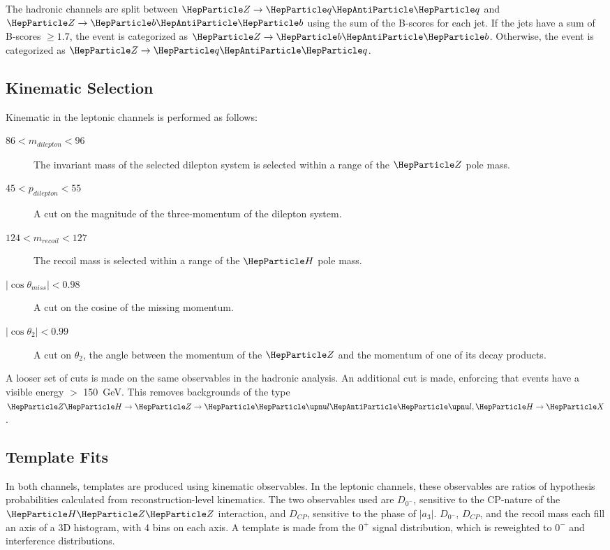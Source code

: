 The hadronic channels are split between $\PZ\to\PQq\PAQq$ and $\PZ\to\PQb\PAQb$ using the sum of the B-scores for each jet. If the jets have a sum of B-scores $\geq 1.7$, the event is categorized as $\PZ\to\PQb\PAQb$. Otherwise, the event is categorized as $\PZ\to\PQq\PAQq$.

\subsection{Kinematic Selection}
\label{3.2}
Kinematic in the leptonic channels is performed as follows: 
\begin{description}
  \item[$86 < m_{dilepton} < 96$] The invariant mass of the selected dilepton system is selected within a range of the $\PZ$ pole mass. 
  \item[$45 < p_{dilepton} < 55$]  A cut on the magnitude of the three-momentum of the dilepton system. 
  \item[$124 < m_{recoil} < 127$] The recoil mass is selected within a range of the $\PH$ pole mass.
  \item[$|\cos{\theta_{miss}}| < 0.98$] A cut on the cosine of the missing momentum. 

  \item[$|\cos{\theta_{2}}| < 0.99$]  A cut on $\theta_2$, the angle between the momentum of the $\PZ$ and the momentum of one of its decay products. 
\end{description}

A looser set of cuts is made on the same observables in the hadronic analysis.  An additional cut is made, enforcing that events have a visible energy $>$ \SI{150}{\giga\electronvolt}. This  removes backgrounds of the type $\PZ\PH\to\PZ\to\PGnl\PAGnl,\PH\to\PX$. 
\subsection{Template Fits}
In both channels, templates are produced using kinematic observables. In the leptonic channels, these observables are ratios of hypothesis probabilities calculated from reconstruction-level kinematics. The two observables used are $D_{0^-}$, sensitive to the CP-nature of the $\PH\PZ\PZ$ interaction, and $D_{CP}$, sensitive to the phase of $|a_3|$. $D_{0^-}$, $D_{CP}$, and the recoil mass each fill an axis of a 3D histogram, with 4 bins on each axis. A template is made from the $0^+$ signal distribution, which is reweighted to $0^-$ and interference distributions.

